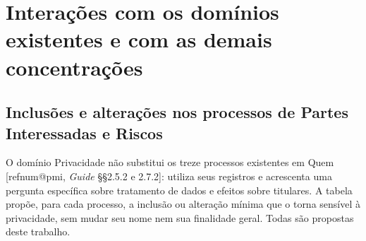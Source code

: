 \documentclass[11pt,a4paper]{article}
\makeatletter
\newcommand{\refnum}[1]{\csname refnum@#1\endcsname}
\makeatother
\begin{document}
\section{Interações com os domínios existentes e com as demais concentrações}
\subsection{Inclusões e alterações nos processos de Partes Interessadas e Riscos}

O domínio Privacidade não substitui os treze processos existentes em Quem [\refnum{pmi}, \textit{Guide} §§2.5.2 e 2.7.2]: utiliza seus registros e acrescenta uma pergunta específica sobre tratamento de dados e efeitos sobre titulares. A tabela propõe, para cada processo, a inclusão ou alteração mínima que o torna sensível à privacidade, sem mudar seu nome nem sua finalidade geral. Todas são propostas deste trabalho.
\end{document}
